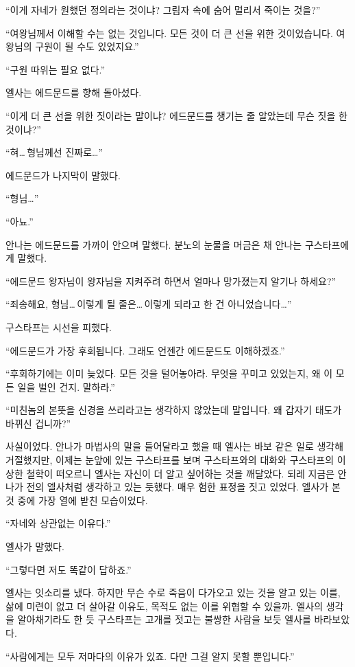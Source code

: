 ``이게 자네가 원했던 정의라는 것이냐? 그림자 속에 숨어 멀리서 죽이는 것을?''

``여왕님께서 이해할 수는 없는 것입니다. 모든 것이 더 큰 선을 위한 것이었습니다. 여왕님의 구원이 될 수도 있었지요.''

``구원 따위는 필요 없다.''

엘사는 에드문드를 향해 돌아섰다.

``이게 더 큰 선을 위한 짓이라는 말이냐? 에드문드를 챙기는 줄 알았는데 무슨 짓을 한 것이냐?''

``혀\ldots\,형님께선 진짜로\ldots''

에드문드가 나지막이 말했다.

``형님\ldots''

``아뇨.''

안나는 에드문드를 가까이 안으며 말했다. 분노의 눈물을 머금은 채 안나는 구스타프에게 말했다.

``에드문드 왕자님이 왕자님을 지켜주려 하면서 얼마나 망가졌는지 알기나 하세요?''

``죄송해요, 형님\ldots\,이렇게 될 줄은\ldots\,이렇게 되라고 한 건 아니었습니다\ldots''

구스타프는 시선을 피했다.

``에드문드가 가장 후회됩니다. 그래도 언젠간 에드문드도 이해하겠죠.''

``후회하기에는 이미 늦었다. 모든 것을 털어놓아라. 무엇을 꾸미고 있었는지, 왜 이 모든 일을 벌인 건지. 말하라.''

``미친놈의 본뜻을 신경을 쓰리라고는 생각하지 않았는데 말입니다. 왜 갑자기 태도가 바뀌신 겁니까?''

사실이었다. 안나가 마법사의 말을 들어달라고 했을 때 엘사는 바보 같은 일로 생각해 거절했지만, 이제는 눈앞에 있는 구스타프를 보며 구스타프와의 대화와 구스타프의 이상한 철학이 떠오르니 엘사는 자신이 더 알고 싶어하는 것을 깨달았다. 되레 지금은 안나가 전의 엘사처럼 생각하고 있는 듯했다. 매우 험한 표정을 짓고 있었다. 엘사가 본 것 중에 가장 열에 받친 모습이었다.

``자네와 상관없는 이유다.''

엘사가 말했다.

``그렇다면 저도 똑같이 답하죠.''

엘사는 잇소리를 냈다. 하지만 무슨 수로 죽음이 다가오고 있는 것을 알고 있는 이를, 삶에 미련이 없고 더 살아갈 이유도, 목적도 없는 이를 위협할 수 있을까. 엘사의 생각을 알아채기라도 한 듯 구스타프는 고개를 젓고는 불쌍한 사람을 보듯 엘사를 바라보았다.

``사람에게는 모두 저마다의 이유가 있죠. 다만 그걸 알지 못할 뿐입니다.''


